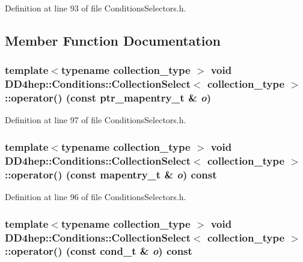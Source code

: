 Definition at line 93 of file ConditionsSelectors.h.

\subsection{Member Function Documentation}
\hypertarget{class_d_d4hep_1_1_conditions_1_1_collection_select_a8015cdd01adc5d11fc52062df45e961e}{
\subsubsection[{operator()}]{\setlength{\rightskip}{0pt plus 5cm}template$<$typename collection\_\-type $>$ void {\bf DD4hep::Conditions::CollectionSelect}$<$ collection\_\-type $>$::operator() (const {\bf ptr\_\-mapentry\_\-t} \& {\em o})}}
\label{class_d_d4hep_1_1_conditions_1_1_collection_select_a8015cdd01adc5d11fc52062df45e961e}


Definition at line 97 of file ConditionsSelectors.h.\hypertarget{class_d_d4hep_1_1_conditions_1_1_collection_select_a58e22e3af53dd0f5ce1829ed048e7867}{
\subsubsection[{operator()}]{\setlength{\rightskip}{0pt plus 5cm}template$<$typename collection\_\-type $>$ void {\bf DD4hep::Conditions::CollectionSelect}$<$ collection\_\-type $>$::operator() (const {\bf mapentry\_\-t} \& {\em o}) const}}
\label{class_d_d4hep_1_1_conditions_1_1_collection_select_a58e22e3af53dd0f5ce1829ed048e7867}


Definition at line 96 of file ConditionsSelectors.h.\hypertarget{class_d_d4hep_1_1_conditions_1_1_collection_select_ae4001ca41cdcd6a293eed61f1b3368d5}{
\subsubsection[{operator()}]{\setlength{\rightskip}{0pt plus 5cm}template$<$typename collection\_\-type $>$ void {\bf DD4hep::Conditions::CollectionSelect}$<$ collection\_\-type $>$::operator() (const {\bf cond\_\-t} \& {\em o}) const}}
\label{class_d_d4hep_1_1_conditions_1_1_collection_select_ae4001ca41cdcd6a293eed61f1b3368d5}


